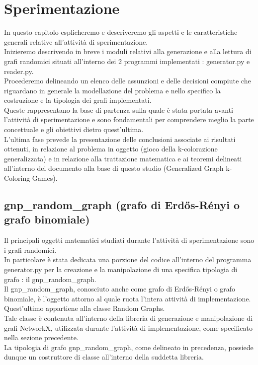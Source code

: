 \chapter{Sperimentazione}
\justify
In questo capitolo esplicheremo e descriveremo gli aspetti e le caratteristiche generali relative all'attività di sperimentazione.\\

Inizieremo descrivendo in breve i moduli relativi alla generazione e alla lettura di grafi randomici situati all'interno dei 2 programmi implementati : generator.py e reader.py.\\

Procederemo delineando un elenco delle assunzioni e delle decisioni compiute che riguardano in generale la modellazione del problema e nello specifico la costruzione e la tipologia dei grafi implementati.\\
Queste rappresentano la base di partenza sulla quale è stata portata avanti l'attività di sperimentazione e sono fondamentali per comprendere meglio la parte concettuale e gli obiettivi dietro quest'ultima.\\

L'ultima fase prevede la presentazione delle conclusioni associate ai risultati ottenuti, in relazione al problema in oggetto (gioco della k-colorazione generalizzata) e in relazione alla trattazione matematica e ai teoremi delineati all'interno del documento alla base di questo studio (Generalized Graph k-Coloring Games).\\

\section{gnp\_random\_graph (grafo di Erdős-Rényi o grafo binomiale)}
\justify
Il principali oggetti matematici studiati durante l'attività di sperimentazione sono i grafi randomici.\\

In particolare è stata dedicata una porzione del codice all'interno del programma generator.py per la creazione e la manipolazione di una specifica tipologia di grafo : il gnp\_random\_graph.\\

Il gnp\_random\_graph, conosciuto anche come grafo di Erdős-Rényi o grafo binomiale, è l'oggetto attorno al quale ruota l'intera attività di implementazione.\\ Quest'ultimo appartiene alla classe Random Graphs.\\
Tale classe è contenuta all'interno della libreria di generazione e manipolazione di grafi NetworkX, utilizzata durante l'attività di implementazione, come specificato nella sezione precedente.\\
La tipologia di grafo gnp\_random\_graph, come delineato in precedenza, possiede dunque un costruttore di classe all'interno della suddetta libreria.\\

